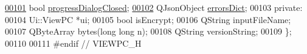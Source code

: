 \begin{DoxyCode}
\mbox{\hyperlink{class_view_p_c_add8c82aa2b0b934212aa5bde9277ab36}{00101}}     \textcolor{keywordtype}{bool} \mbox{\hyperlink{class_view_p_c_add8c82aa2b0b934212aa5bde9277ab36}{progressDialogClosed}};
\mbox{\hyperlink{class_view_p_c_a26f90436aca32e5bad46f5e69a7e7e09}{00102}}     QJsonObject \mbox{\hyperlink{class_view_p_c_a26f90436aca32e5bad46f5e69a7e7e09}{errorsDict}};
00103 \textcolor{keyword}{private}:
00104     Ui::ViewPC *ui;
00105     \textcolor{keywordtype}{bool} isEncrypt;
00106     QString inputFileName;
00107     QByteArray bytes(\textcolor{keywordtype}{long} \textcolor{keywordtype}{long} n);
00108     QString versionString;
00109 \};
00110 
00111 \textcolor{preprocessor}{#endif // VIEWPC\_H}
\end{DoxyCode}
